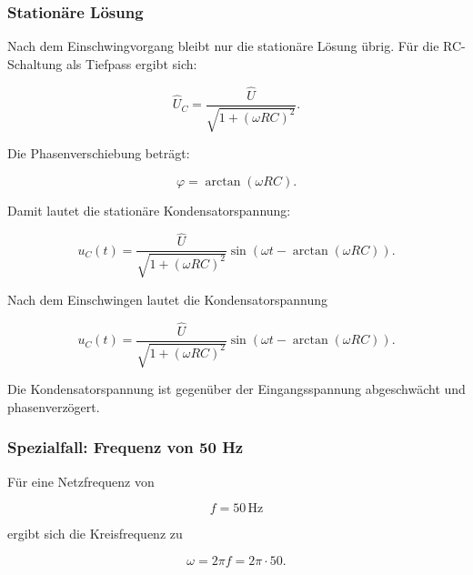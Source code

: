 \subsubsection{Stationäre Lösung}
\label{subsubsec:rc-sinus-stationaere-loesung}

Nach dem Einschwingvorgang bleibt nur die stationäre Lösung übrig. Für die
RC-Schaltung als Tiefpass ergibt sich:

\begin{equation}
	\hat{U}_C
	=
	\frac{\hat{U}}{\sqrt{1+(\omega RC)^2}}.
	\label{eq:rc-amplitude-kondensatorspannung}
\end{equation}

Die Phasenverschiebung beträgt:

\begin{equation}
	\varphi
	=
	\arctan(\omega RC).
	\label{eq:rc-phasenverschiebung}
\end{equation}

Damit lautet die stationäre Kondensatorspannung:

\begin{equation}
	u_C(t)
	=
	\frac{\hat{U}}{\sqrt{1+(\omega RC)^2}}
	\sin\left(
	\omega t
	-
	\arctan(\omega RC)
	\right).
	\label{eq:rc-stationaere-loesung}
\end{equation}

\begin{MathBox}
	\label{box:rc-stationaere-loesung}
	Nach dem Einschwingen lautet die Kondensatorspannung
	
	\[
	u_C(t)
	=
	\frac{\hat{U}}{\sqrt{1+(\omega RC)^2}}
	\sin\left(
	\omega t
	-
	\arctan(\omega RC)
	\right).
	\]
	
	Die Kondensatorspannung ist gegenüber der Eingangsspannung abgeschwächt und
	phasenverzögert.
\end{MathBox}

\subsubsection{Spezialfall: Frequenz von 50 Hz}
\label{subsubsec:rc-sinus-spezialfall-50hz}

Für eine Netzfrequenz von

\begin{equation}
	f = 50\,\mathrm{Hz}
	\label{eq:rc-frequenz-50hz}
\end{equation}

ergibt sich die Kreisfrequenz zu

\begin{equation}
	\omega = 2\pi f = 2\pi \cdot 50.
	\label{eq:rc-kreisfrequenz-50hz}
\end{equation}

